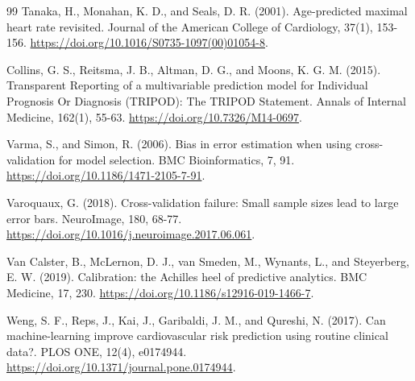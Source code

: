 \documentclass[10pt,twocolumn]{article}
\begin{document}
\begin{thebibliography}{99}
 Tanaka, H., Monahan, K. D., and Seals, D. R. (2001). Age-predicted maximal heart rate revisited. Journal of the American College of Cardiology, 37(1), 153-156. \url{https://doi.org/10.1016/S0735-1097(00)01054-8}.

 Collins, G. S., Reitsma, J. B., Altman, D. G., and Moons, K. G. M. (2015). Transparent Reporting of a multivariable prediction model for Individual Prognosis Or Diagnosis (TRIPOD): The TRIPOD Statement. Annals of Internal Medicine, 162(1), 55-63. \url{https://doi.org/10.7326/M14-0697}.

 Varma, S., and Simon, R. (2006). Bias in error estimation when using cross-validation for model selection. BMC Bioinformatics, 7, 91. \url{https://doi.org/10.1186/1471-2105-7-91}.

 Varoquaux, G. (2018). Cross-validation failure: Small sample sizes lead to large error bars. NeuroImage, 180, 68-77. \url{https://doi.org/10.1016/j.neuroimage.2017.06.061}.

 Van Calster, B., McLernon, D. J., van Smeden, M., Wynants, L., and Steyerberg, E. W. (2019). Calibration: the Achilles heel of predictive analytics. BMC Medicine, 17, 230. \url{https://doi.org/10.1186/s12916-019-1466-7}.

 Weng, S. F., Reps, J., Kai, J., Garibaldi, J. M., and Qureshi, N. (2017). Can machine-learning improve cardiovascular risk prediction using routine clinical data?. PLOS ONE, 12(4), e0174944. \url{https://doi.org/10.1371/journal.pone.0174944}.

\end{thebibliography}
\end{document}
